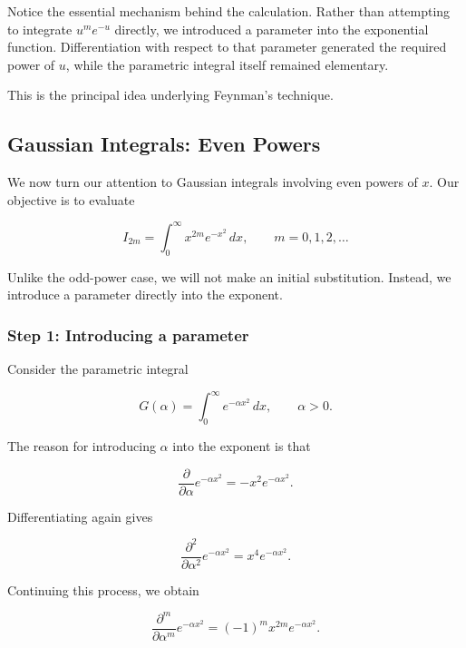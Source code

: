 \documentclass[11pt,a4paper]{article}
\theoremstyle{definition}
\theoremstyle{remark}
\begin{document}
\medskip

Notice the essential mechanism
behind the calculation. Rather
than attempting to integrate
$u^m e^{-u}$ directly, we
introduced a parameter into
the exponential function.
Differentiation with respect
to that parameter generated
the required power of $u$,
while the parametric integral
itself remained elementary.

This is the principal idea
underlying Feynman's technique.

\subsection{Gaussian Integrals: Even Powers}

We now turn our attention to Gaussian
integrals involving even powers of $x$.
Our objective is to evaluate

\begin{equation}
    I_{2m}
    =
    \int_0^\infty x^{2m}e^{-x^2}\,dx,
    \qquad m=0,1,2,\ldots
    \label{eq:gaussian_even}
\end{equation}

Unlike the odd-power case, we will
not make an initial substitution.
Instead, we introduce a parameter
directly into the exponent.

\subsubsection*{Step 1: Introducing a parameter}

Consider the parametric integral

\begin{equation}
    G(\alpha)
    =
    \int_0^\infty e^{-\alpha x^2}\,dx,
    \qquad \alpha>0.
    \label{eq:gaussian_even_parameter}
\end{equation}

The reason for introducing $\alpha$
into the exponent is that

\[
    \frac{\partial}{\partial\alpha}
    e^{-\alpha x^2}
    =
    -x^2e^{-\alpha x^2}.
\]

Differentiating again gives

\[
    \frac{\partial^2}{\partial\alpha^2}
    e^{-\alpha x^2}
    =
    x^4e^{-\alpha x^2}.
\]

Continuing this process, we obtain

\begin{equation}
    \frac{\partial^m}{\partial\alpha^m}
    e^{-\alpha x^2}
    =
    (-1)^m x^{2m}e^{-\alpha x^2}.
    \label{eq:gaussian_even_derivative}
\end{equation}
\end{document}
